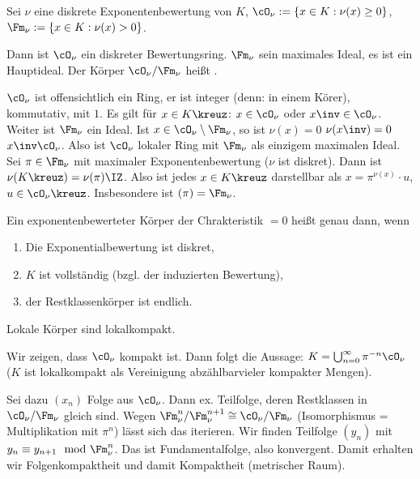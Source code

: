\begin{Fakt}
 Sei $\nu$ eine diskrete Exponentenbewertung von $K$, $\cO_\nu:=\{ x\in K: \nu(x)\geq 0\}$, $\Fm_\nu:=\{ x\in K: \nu(x)>0\}$.
 
 Dann ist $\cO_\nu$ ein diskreter Bewertungsring. $\Fm_\nu$ sein maximales Ideal, es ist ein Hauptideal. Der Körper $\cO_\nu/\Fm_\nu$ heißt .
\end{Fakt}

\begin{Beweis}
 $\cO_\nu$ ist offensichtlich ein Ring, er ist integer (denn: in einem Körer), kommutativ, mit $1$. Es gilt für $x\in K\kreuz$: $x\in\cO_\nu$ oder $x\inv\in\cO_\nu$. Weiter ist $\Fm_\nu$ ein Ideal. Ist $x\in\cO_\nu\setminus\Fm_\nu$, so ist $\nu(x)=0$ \folge $\nu(x\inv)=0$ \folge $x\inv \cO_\nu$. Also ist $\cO_\nu$ lokaler Ring mit $\Fm_\nu$ als einzigem maximalen Ideal.
 Sei $\pi\in\Fm_\nu$ mit maximaler Exponentenbewertung ($\nu$ ist diskret). Dann ist $\nu(K\kreuz)=\nu(\pi)\IZ$. Also ist jedes $x\in K\kreuz$ darstellbar als $x=\pi^{\nu(x)}\cdot u$, $u\in\cO_\nu\kreuz$. Insbesondere ist $(\pi)=\Fm_\nu$.
\end{Beweis}

\begin{Definition}
 Ein exponentenbewerteter Körper der Chrakteristik $=0$ heißt  genau dann, wenn
 \begin{enumerate}
  \item Die Exponentialbewertung ist diskret,
  \item $K$ ist vollständig (bzgl. der induzierten Bewertung),
  \item der Restklassenkörper ist endlich.
 \end{enumerate}
\end{Definition}

\begin{Fakt}
 Lokale Körper sind lokalkompakt.
\end{Fakt}

\begin{Beweis}
 Wir zeigen, dass $\cO_\nu$ kompakt ist. Dann folgt die Aussage: $K=\bigcup_{n=0}^\infty \pi^{-n}\cO_\nu$ ($K$ ist lokalkompakt als Vereinigung abzählbarvieler kompakter Mengen).
 
 Sei dazu $(x_n)$ Folge aus $\cO_\nu$. Dann ex. Teilfolge, deren Restklassen in $\cO_\nu/\Fm_\nu$ gleich sind. Wegen $\Fm_\nu^n/\Fm_\nu^{n+1}\cong \cO_\nu/\Fm_\nu$ (Isomorphismus = Multiplikation mit $\pi^n$) lässt sich das iterieren. \folge Wir finden Teilfolge $(y_n)$ mit $y_n\equiv y_{n+1} \mod{\Fm_\nu^n}$. Das ist Fundamentalfolge, also konvergent. Damit erhalten wir Folgenkompaktheit und damit Kompaktheit (metrischer Raum).
\end{Beweis}

